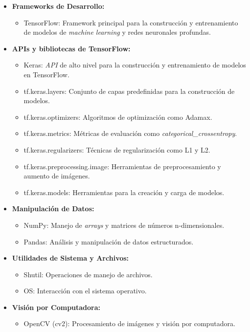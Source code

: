 \begin{itemize}
   \item \textbf{Frameworks de Desarrollo:}
   \begin{itemize}
       \item TensorFlow: Framework principal para la construcción y entrenamiento de modelos de \textit{machine learning} y redes neuronales profundas.
   \end{itemize}

   \item \textbf{APIs y bibliotecas de TensorFlow:}
   \begin{itemize}
       \item Keras: \textit{API} de alto nivel para la construcción y entrenamiento de modelos en TensorFlow.
       \item tf.keras.layers: Conjunto de capas predefinidas para la construcción de modelos.
       \item tf.keras.optimizers: Algoritmos de optimización como Adamax.
       \item tf.keras.metrics: Métricas de evaluación como \textit{categorical\_crossentropy}.
       \item tf.keras.regularizers: Técnicas de regularización como L1 y L2.
       \item tf.keras.preprocessing.image: Herramientas de preprocesamiento y aumento de imágenes.
       \item tf.keras.models: Herramientas para la creación y carga de modelos.
   \end{itemize}

   \item \textbf{Manipulación de Datos:}
   \begin{itemize}
       \item NumPy: Manejo de \textit{arrays} y matrices de números n-dimensionales.
       \item Pandas: Análisis y manipulación de datos estructurados.
   \end{itemize}

   \item \textbf{Utilidades de Sistema y Archivos:}
   \begin{itemize}
       \item Shutil: Operaciones de manejo de archivos.
       \item OS: Interacción con el sistema operativo.
   \end{itemize}

   \item \textbf{Visión por Computadora:}
   \begin{itemize}
       \item OpenCV (cv2): Procesamiento de imágenes y visión por computadora.
   \end{itemize}


\end{itemize}
